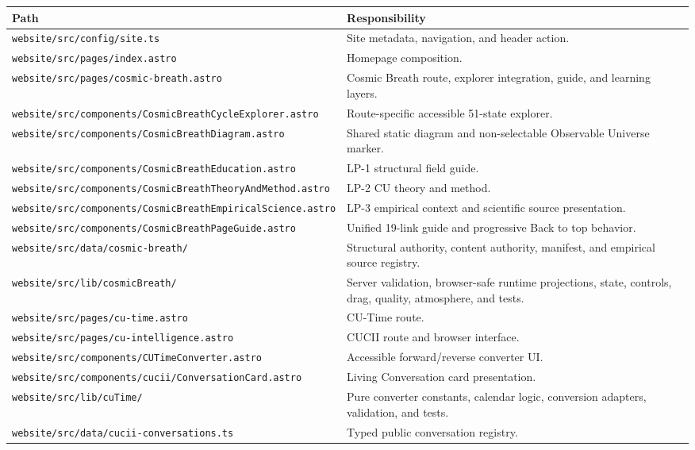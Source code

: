 \documentclass[11pt,letterpaper]{article}
\newcommand{\filepath}[1]{\nolinkurl{#1}}
\begin{document}
\begin{longtable}{L{2.55in}L{3.85in}}
\toprule
\textbf{Path} & \textbf{Responsibility} \\
\midrule
\filepath{website/src/config/site.ts} & Site metadata, navigation, and header action. \\
\filepath{website/src/pages/index.astro} & Homepage composition. \\
\filepath{website/src/pages/cosmic-breath.astro} & Cosmic Breath route, explorer integration, guide, and learning layers. \\
\filepath{website/src/components/CosmicBreathCycleExplorer.astro} & Route-specific accessible 51-state explorer. \\
\filepath{website/src/components/CosmicBreathDiagram.astro} & Shared static diagram and non-selectable Observable Universe marker. \\
\filepath{website/src/components/CosmicBreathEducation.astro} & LP-1 structural field guide. \\
\filepath{website/src/components/CosmicBreathTheoryAndMethod.astro} & LP-2 CU theory and method. \\
\filepath{website/src/components/CosmicBreathEmpiricalScience.astro} & LP-3 empirical context and scientific source presentation. \\
\filepath{website/src/components/CosmicBreathPageGuide.astro} & Unified 19-link guide and progressive Back to top behavior. \\
\filepath{website/src/data/cosmic-breath/} & Structural authority, content authority, manifest, and empirical source registry. \\
\filepath{website/src/lib/cosmicBreath/} & Server validation, browser-safe runtime projections, state, controls, drag, quality, atmosphere, and tests. \\
\filepath{website/src/pages/cu-time.astro} & CU-Time route. \\
\filepath{website/src/pages/cu-intelligence.astro} & CUCII route and browser interface. \\
\filepath{website/src/components/CUTimeConverter.astro} & Accessible forward/reverse converter UI. \\
\filepath{website/src/components/cucii/ConversationCard.astro} & Living Conversation card presentation. \\
\filepath{website/src/lib/cuTime/} & Pure converter constants, calendar logic, conversion adapters, validation, and tests. \\
\filepath{website/src/data/cucii-conversations.ts} & Typed public conversation registry. \\

\end{longtable}
\end{document}
